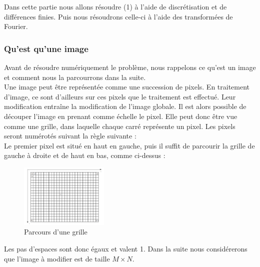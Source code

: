 Dans cette partie nous allons résoudre (1) à l'aide de discrétisation et de différences finies. Puis nous résoudrons celle-ci à l'aide des transformées de Fourier. \\
\subsubsection{Qu'est qu'une image}
Avant de résoudre numériquement le problème, nous rappelons ce qu'est un image et comment nous la  parcourrons dans la suite.\\
Une image peut être représentée comme une succession de pixels. En traitement d'image, ce sont d'ailleurs sur ces pixels que le traitement est effectué. Leur modification entraîne la modification de l'image globale. Il est alors possible de découper l'image en prenant comme échelle le pixel. Elle peut donc être vue comme une grille, dans laquelle chaque carré représente un pixel. Les pixels seront numérotés suivant la règle suivante : \\

Le premier pixel est situé en haut en gauche, puis il suffit de parcourir la grille de gauche à droite et de haut en bas, comme ci-dessus :  
\begin{figure}[!h]
     \centering
     \includegraphics[width = 120pt]{Images/grille.png}
	\caption{Parcours d'une grille}
\end{figure}

Les pas d'espaces sont donc égaux et valent 1. Dans la suite nous considérerons que l'image à modifier est de taille $M \times N$.

